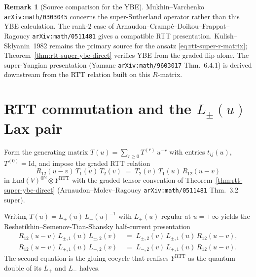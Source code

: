 \documentclass[11pt]{amsart}
\theoremstyle{definition}
\newtheorem{remark}[theorem]{Remark}
\providecommand{\End}{\mathrm{End}}
\begin{document}
\begin{remark}[Source comparison for the YBE]
\label{rem:ybe-direct-vs-citation}
Mukhin--Varchenko \texttt{arXiv:math/0303045} concerns the
super-Sutherland operator rather than this YBE calculation. The rank-$2$
case of Arnaudon--Crampé--Doikou--Frappat--Ragoucy
\texttt{arXiv:math/0511481} gives a compatible RTT presentation.
Kulish--Sklyanin~1982 remains the primary source for the ansatz
\eqref{eq:rtt-super-r-matrix}; Theorem~\ref{thm:rtt-super-ybe-direct}
verifies YBE from the graded flip alone. The super-Yangian presentation
(Yamane \texttt{arXiv:math/9603017} Thm.~6.4.1) is derived downstream
from the RTT relation built on this $R$-matrix.
\end{remark}

\section{RTT commutation and the $L_\pm(u)$ Lax pair}
\label{sec:RTT-Lax}

Form the generating matrix $T(u) = \sum_{r \geq 0} T^{(r)}\, u^{-r}$ with
entries $t_{ij}(u)$, $T^{(0)} = \mathrm{Id}$, and impose the graded RTT
relation
\begin{equation}\label{eq:rtt-super-relation}
  R_{12}(u - v)\, T_1(u)\, T_2(v)
  \;=\;
  T_2(v)\, T_1(u)\, R_{12}(u - v)
\end{equation}
in $\End(V)^{\otimes 2} \otimes Y^{\mathrm{RTT}}$ with the graded tensor
convention of Theorem~\ref{thm:rtt-super-ybe-direct}
(Arnaudon--Molev--Ragoucy \texttt{arXiv:math/0511481} Thm.~3.2 super).

Writing $T(u) = L_+(u)\, L_-(u)^{-1}$ with $L_\pm(u)$ regular at
$u = \pm\infty$ yields the Reshetikhin--Semenov-Tian-Shansky half-current
presentation
\begin{equation}\label{eq:rtt-half-current}
\begin{aligned}
  R_{12}(u - v)\, L_{\pm, 1}(u)\, L_{\pm, 2}(v)
  &\;=\;
  L_{\pm, 2}(v)\, L_{\pm, 1}(u)\, R_{12}(u - v), \\
  R_{12}(u - v)\, L_{+, 1}(u)\, L_{-, 2}(v)
  &\;=\;
  L_{-, 2}(v)\, L_{+, 1}(u)\, R_{12}(u - v).
\end{aligned}
\end{equation}
The second equation is the gluing cocycle that realises
$Y^{\mathrm{RTT}}$ as the quantum double of its $L_+$ and $L_-$ halves.
\end{document}
